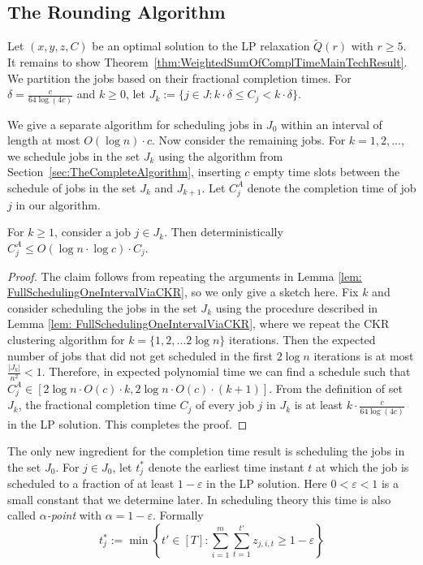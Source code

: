 \subsection{The Rounding Algorithm}
Let $(x, y, z, C)$ be an optimal solution to the LP relaxation $\tilde{Q}(r)$ with $r \geq 5$.
It remains to show Theorem~\ref{thm:WeightedSumOfComplTimeMainTechResult}.
We partition the jobs based on their fractional completion times. 
For  $\delta = \frac{c}{64 \log(4c)}$
and  $k \geq 0$, let $J_k := \{j \in J : k \cdot \delta \leq C_j < k \cdot \delta\}$. 

 
We give a separate  algorithm for scheduling jobs in $J_0$ within an interval of length at most $O(\log n) \cdot c$.
Now consider the remaining jobs.
For $k = 1,2,...$, we schedule jobs in the set $J_k$  using the algorithm from Section~\ref{sec:TheCompleteAlgorithm},
inserting $c$ empty time slots between the schedule of jobs in the set $J_k$ and $J_{k+1}$.
Let $C^{A}_j$ denote the completion time of job $j$ in our algorithm.

\begin{lemma}
\label{lem:comp5}
For $k \geq 1$, consider a job $j \in J_k$. Then deterministically $C^{A}_j \leq O(\log n \cdot \log c) \cdot C_j $.
\end{lemma}

\begin{proof}
The claim follows from repeating the arguments in Lemma \ref{lem: FullSchedulingOneIntervalViaCKR}, so we only give a sketch here. 
Fix $k$ and consider scheduling the jobs in the set $J_k$ using the procedure described in Lemma \ref{lem: FullSchedulingOneIntervalViaCKR}, where we repeat the CKR clustering algorithm for $k = \{1,2, \ldots 2\log n\}$ iterations. 
Then the expected number of jobs that did not get scheduled in the first $2\log n$ iterations is at most $\frac{|J_k|}{n^2} < 1$. Therefore, in expected polynomial time we can find a schedule such that  $C^{A}_j  \in [2\log n \cdot O(c) \cdot k, 2\log n \cdot O(c) \cdot (k+1)]$.
From the definition of set $J_k$,  the fractional completion time $C_j$ of every job $j$ in $J_k$ is at least $k \cdot \frac{c}{64 \log (4c)}$ in the LP solution.
This completes the proof.
\end{proof}

The only new ingredient  for the completion time result is scheduling the jobs in the set $J_0$. 
For $j \in J_0$, let $t^*_j$ denote the earliest time instant $t$ at which the job is  scheduled to a fraction of at least $1-\varepsilon$ in the LP solution. Here $0<\varepsilon<1$ is a small constant that we determine later.
In scheduling theory this time is also called \emph{$\alpha$-point} with $\alpha = 1-\varepsilon$.
Formally 
\begin{equation} \label{eq:AlphaPoints}
  t^*_j := \min \left\{t' \in [T]:  \sum_{i=1}^m  \sum^{t'}_{t = 1} z_{j,i,t} \geq 1-\varepsilon   \right\}
\end{equation}


